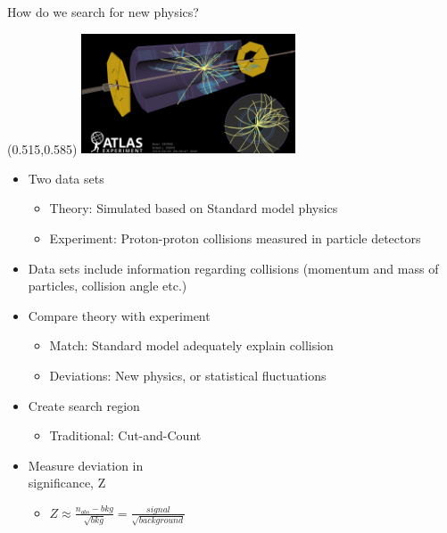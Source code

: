 \documentclass[UKenglish]{beamer}
\begin{document}
\begin{frame}{How do we search for new physics?}
    \begin{textblock}{1}(0.515,0.585)
        \includegraphics[width=0.475\textwidth]{figures/Collisions.jpeg}
    \end{textblock}
    \begin{itemize}
        \item Two data sets 
        \begin{itemize}
            \item Theory: Simulated based on Standard model physics 
            \item Experiment: Proton-proton collisions measured in particle detectors
        \end{itemize}
        \item Data sets include information regarding collisions (momentum and mass of particles, collision angle etc.)
        \item Compare theory with experiment 
        \begin{itemize}
            \item Match: Standard model adequately explain collision
            \item Deviations: New physics, or statistical fluctuations 
        \end{itemize}
        \item Create search region
        \begin{itemize}
            \item Traditional: Cut-and-Count
        \end{itemize}
        \item Measure deviation in \\ significance, Z 
        \begin{itemize}
            \item $Z\approx \frac{n_{obs} - bkg}{\sqrt{bkg}} = \frac{signal}{\sqrt{background}}$
        \end{itemize}
    \end{itemize}

\end{frame}
\end{document}
